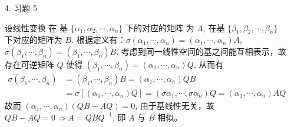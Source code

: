 \documentclass{article}
\begin{document}
\begin{spacing}{1.5}
\begin{itemize}
    \item [4.] 习题 5
    
    设线性变换 在 基 $\{\alpha_1, \alpha_2, \cdots, \alpha_n\}$ 下的对应的矩阵 为 $A$, 在基 $\{\beta_1, \beta_2, \cdots, \beta_n\}$ 下对应的矩阵为 $B$. 根据定义有：$\sigma (\alpha_1, \cdots, \alpha_n) = (\alpha_1, \cdots, \alpha_n) A$, $\sigma (\beta_1, \cdots, \beta_n) =(\beta_1, \cdots, \beta_n) B$. 考虑到同一线性空间的基之间能互相表示，故存在可逆矩阵 $Q$ 使得 $(\beta_1, \cdots, \beta_n) = (\alpha_1, \cdots, \alpha_n)Q$, 从而有 $$\begin{array}{ll}\sigma(\beta_1, \cdots, \beta_n) &= (\beta_1, \cdots, \beta_n)B = (\alpha_1,\cdots,\alpha_n)QB\\ &= \sigma [(\alpha_1, \cdots, \alpha_n) Q] = (\sigma\alpha_1, \cdots, \sigma\alpha_n)Q = (\alpha_1,\cdots,\alpha_n) AQ\end{array}$$
    故而 $(\alpha_1, \cdots, \alpha_n) (QB - AQ) = 0$, 由于基线性无关，故 $QB - AQ = 0 \Rightarrow A = QBQ^{-1}$, 即 $A$ 与 $B$ 相似。
    
\end{itemize}

\end{spacing}
\end{document}
